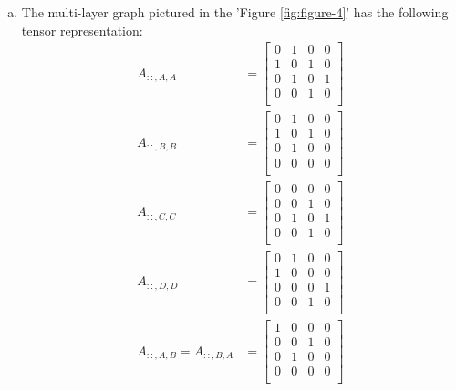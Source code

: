 \documentclass{article}
\begin{document}
    \begin{enumerate}[a)]
    \item The multi-layer graph pictured in the 'Figure \ref{fig:figure-4}' has the following tensor representation:
    \begin{align*}
            A_{::,A,A} &= 
            \begin{bmatrix}
            0 & 1 & 0 & 0 \\
            1 & 0 & 1 & 0 \\
            0 & 1 & 0 & 1 \\
            0 & 0 & 1 & 0 \\
            \end{bmatrix}\\
            A_{::,B,B} &= 
            \begin{bmatrix}
            0 & 1 & 0 & 0 \\
            1 & 0 & 1 & 0 \\
            0 & 1 & 0 & 0 \\
            0 & 0 & 0 & 0 \\
            \end{bmatrix}\\
            A_{::,C,C} &= 
            \begin{bmatrix}
            0 & 0 & 0 & 0 \\
            0 & 0 & 1 & 0 \\
            0 & 1 & 0 & 1 \\
            0 & 0 & 1 & 0 \\
            \end{bmatrix}\\
            A_{::,D,D} &= 
            \begin{bmatrix}
            0 & 1 & 0 & 0 \\
            1 & 0 & 0 & 0 \\
            0 & 0 & 0 & 1 \\
            0 & 0 & 1 & 0 \\
            \end{bmatrix}\\
            A_{::,A,B} = A_{::,B,A} &= 
            \begin{bmatrix}
            1 & 0 & 0 & 0 \\
            0 & 0 & 1 & 0 \\
            0 & 1 & 0 & 0 \\
            0 & 0 & 0 & 0 \\
            \end{bmatrix}\\

\end{align*}
\end{enumerate}
\end{document}
